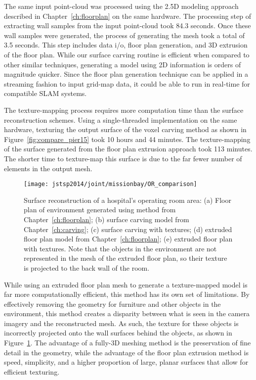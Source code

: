 \documentclass[12pt,onecolumn,oneside]{book}
\begin{document}
The same input point-cloud was processed using the 2.5D modeling approach described in Chapter~\ref{ch:floorplan} on the same hardware.  The processing step of extracting wall samples from the input point-cloud took 84.3 seconds.  Once these wall samples were generated, the process of generating the mesh took a total of 3.5 seconds.  This step includes data i/o, floor plan generation, and 3D extrusion of the floor plan.  While our surface carving routine is efficient when compared to other similar techniques, generating a model using 2D information is orders of magnitude quicker.  Since the floor plan generation technique can be applied in a streaming fashion to input grid-map data, it could be able to run in real-time for compatible SLAM systems.

The texture-mapping process requires more computation time than the surface reconstruction schemes.  Using a single-threaded implementation on the same hardware, texturing the output surface of the voxel carving method as shown in Figure~\ref{fig:compare_pier15} took 10 hours and 44 minutes.  The texture-mapping of the surface generated from the floor plan extrusion approach took 113 minutes. The shorter time to texture-map this surface is due to the far fewer number of elements in the output mesh.

\begin{figure}[t]
	\centerline{\texttt{[image: jstsp2014/joint/missionbay/OR\_comparison]}}
	\caption[Comparison of surface reconstruction methods for hospital operating rooms.]{Surface reconstruction of a hospital's operating room area:  (a) Floor plan of environment generated using method from Chapter~\ref{ch:floorplan}; (b) surface carving model from Chapter~\ref{ch:carving}; (c) surface carving with textures; (d) extruded floor plan model from Chapter~\ref{ch:floorplan}; (e) extruded floor plan with textures.  Note that the objects in the environment are not represented in the mesh of the extruded floor plan, so their texture is projected to the back wall of the room.}
	\label{fig:comparison_missionbay}
\end{figure}

While using an extruded floor plan mesh to generate a texture-mapped model is far more computationally efficient, this method has its own set of limitations.  By effectively removing the geometry for furniture and other objects in the environment, this method creates a disparity between what is seen in the camera imagery and the reconstructed mesh.  As such, the texture for these objects is incorrectly projected onto the wall surfaces behind the objects, as shown in Figure~\ref{fig:comparison_missionbay}.  The advantage of a fully-3D meshing method is the preservation of fine detail in the geometry, while the advantage of the floor plan extrusion method is speed, simplicity, and a higher proportion of large, planar surfaces that allow for efficient texturing.
\end{document}
